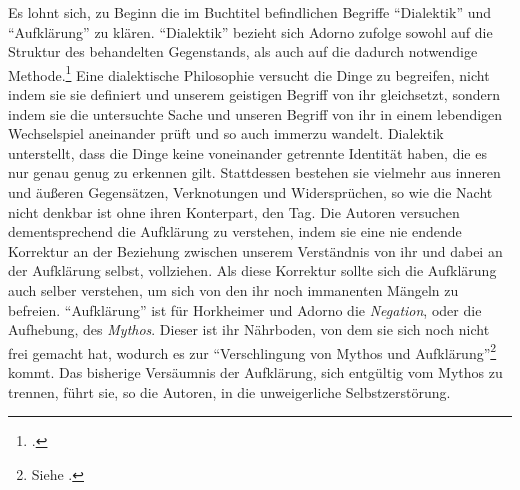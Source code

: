 \documentclass[a4paper, 12pt]{article}
\begin{document}
\begin{onehalfspace}
Es lohnt sich, zu Beginn die im Buchtitel befindlichen Begriffe "`Dialektik"' und "`Aufklärung"' zu klären. "`Dialektik"' bezieht sich Adorno zufolge sowohl auf die Struktur des behandelten Gegenstands, als auch auf die dadurch notwendige Methode.\footnote{\Cite[Vgl.][S. 9]{dialektik}.} Eine dialektische Philosophie versucht die Dinge zu begreifen, nicht indem sie sie definiert und unserem geistigen Begriff von ihr gleichsetzt, sondern indem sie die untersuchte Sache und unseren Begriff von ihr in einem lebendigen Wechselspiel aneinander prüft und so auch immerzu wandelt. Dialektik unterstellt, dass die Dinge keine voneinander getrennte Identität haben, die es nur genau genug zu erkennen gilt. Stattdessen bestehen sie vielmehr aus inneren und äußeren Gegensätzen, Verknotungen und Widersprüchen, so wie die Nacht nicht denkbar ist ohne ihren Konterpart, den Tag. Die Autoren versuchen dementsprechend die Aufklärung zu verstehen, indem sie eine nie endende Korrektur an der Beziehung zwischen unserem Verständnis von ihr und dabei an der Aufklärung selbst, vollziehen. Als diese Korrektur sollte sich die Aufklärung auch selber verstehen, um sich von den ihr noch immanenten Mängeln zu befreien. "`Aufklärung"' ist für Horkheimer und Adorno die \emph{Negation}, oder die Aufhebung, des \emph{Mythos}. Dieser ist ihr Nährboden, von dem sie sich noch nicht frei gemacht hat, wodurch es zur "`Verschlingung von Mythos und Aufklärung"'\footnote{Siehe \Cite{habermas}.} kommt. Das bisherige Versäumnis der Aufklärung, sich entgültig vom Mythos zu trennen, führt sie, so die Autoren, in die unweigerliche Selbstzerstörung.


\end{onehalfspace}
\end{document}
